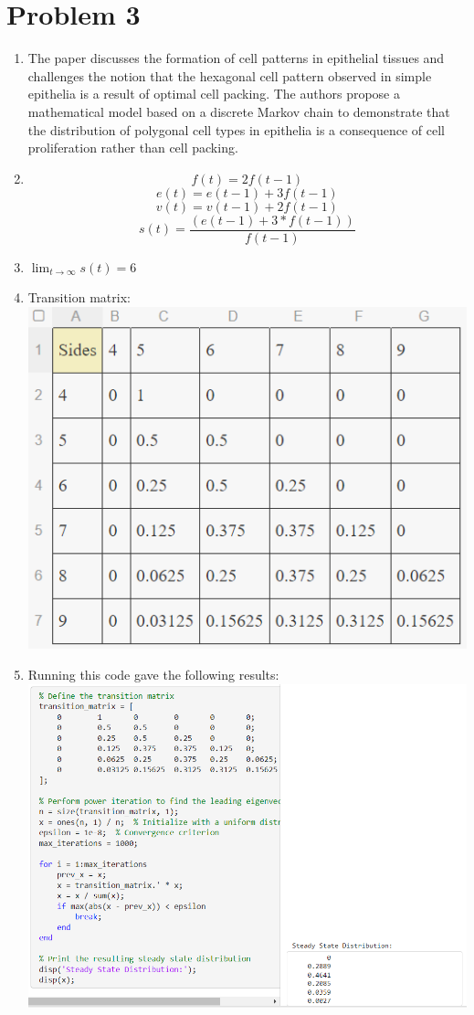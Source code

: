 \documentclass{article}
\begin{document}
\section*{Problem 3}
\begin{enumerate}[label=(\alph*)]
    \item The paper discusses the formation of cell patterns in epithelial tissues and challenges the notion that the hexagonal cell pattern observed in simple epithelia is a result of optimal cell packing. The authors propose a mathematical model based on a discrete Markov chain to demonstrate that the distribution of polygonal cell types in epithelia is a consequence of cell proliferation rather than cell packing.
    \item $$f(t)=2f(t-1)$$ $$e(t)=e(t-1)+3f(t-1)$$ $$v(t)=v(t-1)+2f(t-1)$$ $$s(t) = \frac{(e(t-1) + 3 * f(t-1))}{f(t-1)}$$
    \item $\lim_{t\to \infty}{s(t)}=6$
    \item Transition matrix: \newline\includegraphics[scale=.35]{Pictures/Matrix3.png}
    \item Running this code gave the following results:\newline\includegraphics[scale=.5]{Pictures/Code.png}\begin{itemize}

\end{itemize}
\end{enumerate}
\end{document}

